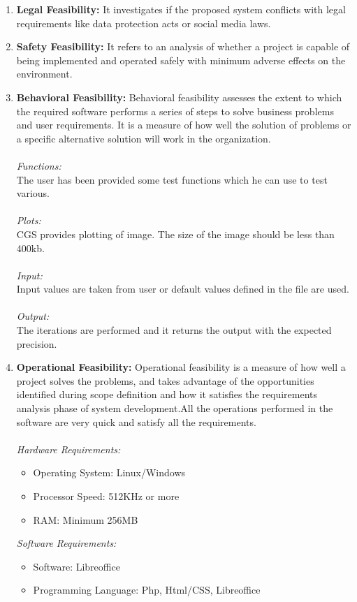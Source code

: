 \begin{enumerate}
\item \textbf{Legal Feasibility:} It investigates if the proposed system conflicts with legal requirements like data protection acts or social media laws.
\item \textbf{Safety Feasibility:} It refers to an analysis of whether a project is capable of being implemented and operated safely with minimum adverse effects on the environment.
        \item \textbf{Behavioral Feasibility:} Behavioral feasibility assesses the extent to which the required software performs a series of steps to solve business problems and user requirements. It is a measure of how well the solution of problems or a specific alternative solution will work in the organization.\\\\
\emph{Functions:}\\
The user has been provided some test functions which he can use to test various.\\\\
\emph{Plots:}\\
CGS provides plotting of image. The size of the image should be less than 400kb.\\\\
\emph{Input:}\\
Input values are taken from user or default values defined in the file are used.\\\\
\emph{Output:}\\
The iterations are performed and it returns the output with the expected precision.
\item \textbf{Operational Feasibility:} Operational feasibility is a measure of how well a project solves the problems, and takes advantage of the opportunities identified during scope definition and how it satisfies the requirements analysis phase of system  development.All the operations performed in the software are very quick and satisfy all the requirements.\\\\
\emph{Hardware Requirements:}
\begin{itemize}
\item Operating System: Linux/Windows
\item Processor Speed: 512KHz or more
\item RAM: Minimum 256MB
\end{itemize}
         \emph{Software Requirements:}
\begin{itemize}
\item Software: Libreoffice
\item Programming Language: Php, Html/CSS, Libreoffice
\end{itemize}
\end{enumerate}

